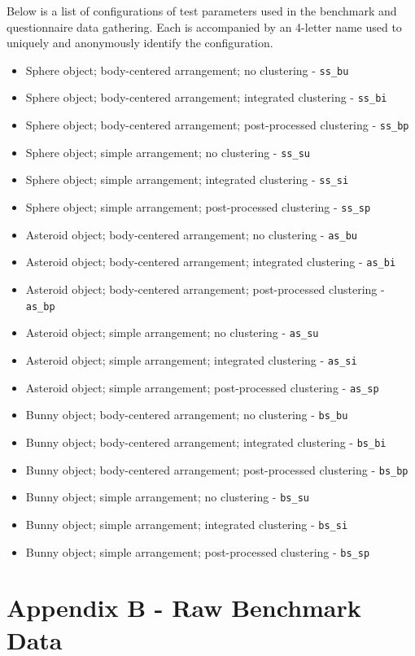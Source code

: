 \documentclass[]{article}
\providecommand{\tightlist}{%
  \setlength{\itemsep}{0pt}\setlength{\parskip}{0pt}}
\begin{document}
Below is a list of configurations of test parameters used in the benchmark and questionnaire data gathering. Each is accompanied by an 4-letter name used to uniquely and anonymously identify the configuration.
\begin{itemize}
\tightlist
\item Sphere object; body-centered arrangement; no clustering - \verb+ss_bu+
\item Sphere object; body-centered arrangement; integrated clustering - \verb+ss_bi+
\item Sphere object; body-centered arrangement; post-processed clustering - \verb+ss_bp+
\item Sphere object; simple arrangement; no clustering - \verb+ss_su+
\item Sphere object; simple arrangement; integrated clustering - \verb+ss_si+
\item Sphere object; simple arrangement; post-processed clustering - \verb+ss_sp+
\item Asteroid object; body-centered arrangement; no clustering - \verb+as_bu+
\item Asteroid object; body-centered arrangement; integrated clustering - \verb+as_bi+
\item Asteroid object; body-centered arrangement; post-processed clustering - \verb+as_bp+
\item Asteroid object; simple arrangement; no clustering - \verb+as_su+
\item Asteroid object; simple arrangement; integrated clustering - \verb+as_si+
\item Asteroid object; simple arrangement; post-processed clustering - \verb+as_sp+
\item Bunny object; body-centered arrangement; no clustering - \verb+bs_bu+
\item Bunny object; body-centered arrangement; integrated clustering - \verb+bs_bi+
\item Bunny object; body-centered arrangement; post-processed clustering - \verb+bs_bp+
\item Bunny object; simple arrangement; no clustering - \verb+bs_su+
\item Bunny object; simple arrangement; integrated clustering - \verb+bs_si+
\item Bunny object; simple arrangement; post-processed clustering - \verb+bs_sp+
\end{itemize}

\pagebreak

\section{Appendix B - Raw Benchmark Data}\label{appendix-b}
\end{document}
